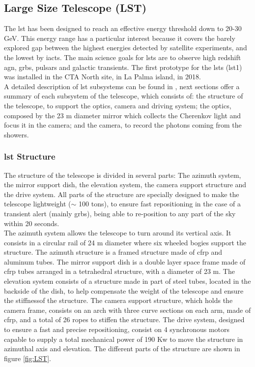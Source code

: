 \documentclass[main.tex]{subfiles}
\begin{document}
\subsection{Large Size Telescope (LST)}

The \gls{lst} has been designed to reach an effective energy threshold down to 20-30 GeV. This energy range has a particular interest because it covers the barely explored gap between the highest energies detected by satellite experiments, and the lowest by \glspl{iact}. The main science goals for \glspl{lst} are to observe high redshift \gls{agn}, \glspl{grb}, pulsars and galactic transients. The first prototype for the \glspl{lst} (\gls{lst}1) was installed in the CTA North site, in La Palma island, in 2018.\\
A detailed description of \gls{lst} subsystems can be found in \cite{2013LST}, next sections offer a summary of each subsystem of the telescope, which consists of: the structure of the telescope, to support the optics, camera and driving system; the optics, composed by the 23 m diameter mirror which collects the Cherenkov light and focus it in the camera; and the camera, to record the photons coming from the showers.  

\subsubsection{\gls{lst} Structure}

The structure of the telescope is divided in several parts: The azimuth system, the mirror support dish, the elevation system, the camera support structure and the drive system. All parts of the structure are specially designed to make the telescope lightweight ($\sim$ 100 tons), to ensure fast repositioning in the case of a transient alert (mainly \glspl{grb}), being able to re-position to any part of the sky within 20 seconds.\\
The azimuth system allows the telescope to turn around its vertical axis. It consists in a circular rail of 24 m diameter where six wheeled bogies support the structure. The azimuth structure is a framed structure made of \gls{cfrp} and aluminum tubes. The mirror support dish is a double layer space frame made of \gls{cfrp} tubes arranged in a tetrahedral structure, with a diameter of 23 m. The elevation system consists of a structure made in part of steel tubes, located in the backside of the dish, to help compensate the weight of the telescope and ensure the stiffnessof the structure. The camera support structure, which holds the camera frame, consists on an arch with three curve sections on each arm, made of \gls{cfrp}, and a total of 26 ropes to stiffen the structure. The drive system, designed to ensure a fast and precise repositioning, consist on 4 synchronous motors capable to supply a total mechanical power of 190 Kw to move the structure in azimuthal axis and elevation. The different parts of the structure are shown in figure \ref{fig:LST}.
    
\end{document}
